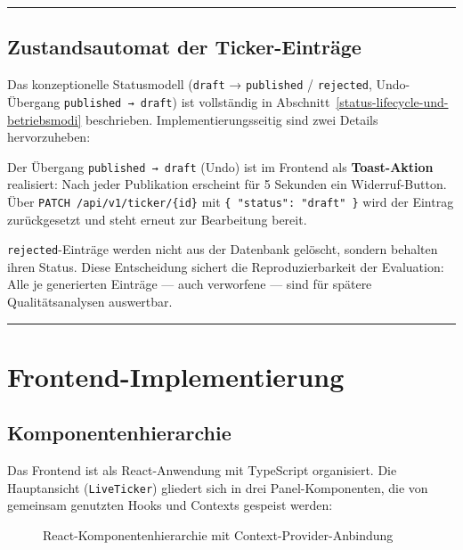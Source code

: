 \begin{center}\rule{0.5\linewidth}{0.5pt}\end{center}

\subsection{Zustandsautomat der
Ticker-Einträge}\label{zustandsautomat-der-ticker-eintruxe4ge}

Das konzeptionelle Statusmodell (\texttt{draft} → \texttt{published} /
\texttt{rejected}, Undo-Übergang \texttt{published\ →\ draft}) ist
vollständig in Abschnitt~\ref{status-lifecycle-und-betriebsmodi} beschrieben. Implementierungsseitig sind
zwei Details hervorzuheben:

Der Übergang \texttt{published\ →\ draft} (Undo) ist im Frontend als
\textbf{Toast-Aktion} realisiert: Nach jeder Publikation erscheint für 5
Sekunden ein Widerruf-Button. Über \texttt{PATCH\ /api/v1/ticker/\{id\}}
mit \texttt{\{\ "status":\ "draft"\ \}} wird der Eintrag zurückgesetzt
und steht erneut zur Bearbeitung bereit.

\texttt{rejected}-Einträge werden nicht aus der Datenbank gelöscht,
sondern behalten ihren Status. Diese Entscheidung sichert die
Reproduzierbarkeit der Evaluation: Alle je generierten Einträge --- auch
verworfene --- sind für spätere Qualitätsanalysen auswertbar.

\begin{center}\rule{0.5\linewidth}{0.5pt}\end{center}

\section{Frontend-Implementierung}\label{frontend-implementierung}

\subsection{Komponentenhierarchie}\label{komponentenhierarchie}

Das Frontend ist als React-Anwendung mit TypeScript organisiert. Die
Hauptansicht (\texttt{LiveTicker}) gliedert sich in drei
Panel-Komponenten, die von gemeinsam genutzten Hooks und Contexts
gespeist werden:

\begin{figure}[H]
\centering
\DiagramFrontendComponentTree
\caption{React-Komponentenhierarchie mit Context-Provider-Anbindung}
\label{fig:frontendtree}
\end{figure}

